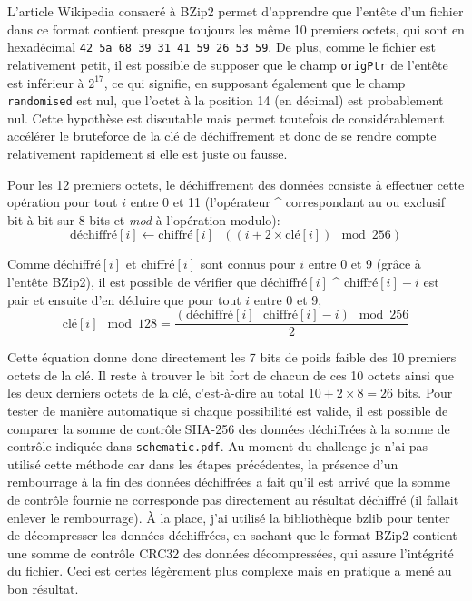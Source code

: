 \documentclass[a4paper,10pt]{article}
\begin{document}
L'article Wikipedia consacré à BZip2 permet d'apprendre que l'entête d'un fichier dans ce format contient presque toujours les même 10 premiers octets, qui sont en hexadécimal \texttt{42 5a 68 39 31 41 59 26 53 59}.
De plus, comme le fichier est relativement petit, il est possible de supposer que le champ \texttt{origPtr} de l'entête est inférieur à $2^{17}$, ce qui signifie, en supposant également que le champ \texttt{randomised} est nul, que l'octet à la position 14 (en décimal) est probablement nul.
Cette hypothèse est discutable mais permet toutefois de considérablement accélérer le bruteforce de la clé de déchiffrement et donc de se rendre compte relativement rapidement si elle est juste ou fausse.

Pour les 12 premiers octets, le déchiffrement des données consiste à effectuer cette opération pour tout $i$ entre 0 et 11 (l'opérateur \^{} correspondant au ou exclusif bit-à-bit sur 8 bits et \emph{mod} à l'opération modulo):
\begin{displaymath}
  \mbox{déchiffré}[i] \leftarrow \mbox{chiffré}[i] \mbox{ \^{} } ((i + 2 \times \mbox{clé}[i]) \mod 256)
\end{displaymath}

Comme déchiffré$[i]$ et chiffré$[i]$ sont connus pour $i$ entre 0 et 9 (grâce à l'entête BZip2), il est possible de vérifier que déchiffré$[i]$ \^{} chiffré$[i] - i$ est pair et ensuite d'en déduire que pour tout $i$ entre 0 et 9,
\begin{displaymath}
  \mbox{clé}[i] \mod 128 = \frac{(\mbox{déchiffré}[i] \mbox{ \^{} } \mbox{chiffré}[i] - i) \mod 256}{2}
\end{displaymath}

Cette équation donne donc directement les 7 bits de poids faible des 10 premiers octets de la clé.
Il reste à trouver le bit fort de chacun de ces 10 octets ainsi que les deux derniers octets de la clé, c'est-à-dire au total $10 + 2 \times 8 = 26$ bits.
Pour tester de manière automatique si chaque possibilité est valide, il est possible de comparer la somme de contrôle SHA-256 des données déchiffrées à la somme de contrôle indiquée dans \texttt{schematic.pdf}.
Au moment du challenge je n'ai pas utilisé cette méthode car dans les étapes précédentes, la présence d'un rembourrage à la fin des données déchiffrées a fait qu'il est arrivé que la somme de contrôle fournie ne corresponde pas directement au résultat déchiffré (il fallait enlever le rembourrage).
À la place, j'ai utilisé la bibliothèque bzlib pour tenter de décompresser les données déchiffrées, en sachant que le format BZip2 contient une somme de contrôle CRC32 des données décompressées, qui assure l'intégrité du fichier.
Ceci est certes légèrement plus complexe mais en pratique a mené au bon résultat.
\end{document}
